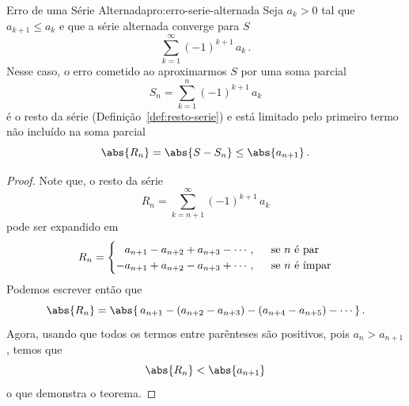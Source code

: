 \begin{proposicao}{Erro de uma Série Alternada}{pro:erro-serie-alternada}
  Seja%
  $a_k>0$ tal que $a_{k+1}\leq a_k$ e que a série alternada converge para $S$
  \[
    \sum_{k=1}^\infty (-1)^{k+1}\,a_k     \,.
  \]
  Nesse caso, o erro cometido ao aproximarmos $S$ por uma soma parcial
  \[
    S_n = \sum_{k=1}^n (-1)^{k+1}\,a_k
  \]
  é o resto da série (Definição~\ref{def:resto-serie}) e está limitado pelo
  primeiro termo não incluído na soma parcial
  \[
    \abs{R_n} = \abs{S - S_n} \leq \abs{a_{n+1} }    \,.
  \]
\end{proposicao}
\begin{proof}
  Note que, o resto da série
  \[
    R_n = \sum_{k=n+1}^\infty(-1)^{k+1}\,a_k
  \]
  pode ser expandido em
  \[
    R_n =
    \begin{cases}
      \hphantom{-} a_{n+1}-a_{n+2}+a_{n+3}-\cdots, & \;\text{ se } n \text{ é par} \\
      -            a_{n+1}+a_{n+2}-a_{n+3}+\cdots, & \;\text{ se } n \text{ é ímpar}
    \end{cases}
  \]
  Podemos escrever então que
  \[
    \abs{R_n} = \abs{\,a_{n+1}-(a_{n+2}-a_{n+3})-(a_{n+4}-a_{n+5})-\cdots\,}     \,.
  \]
  Agora, usando que todos os termos entre parênteses são positivos,
  pois $a_{n}>a_{n+1}$, temos que
  \[
    \abs{R_n} < \abs{a_{n+1}}
  \]
  o que demonstra o teorema.
\end{proof}

